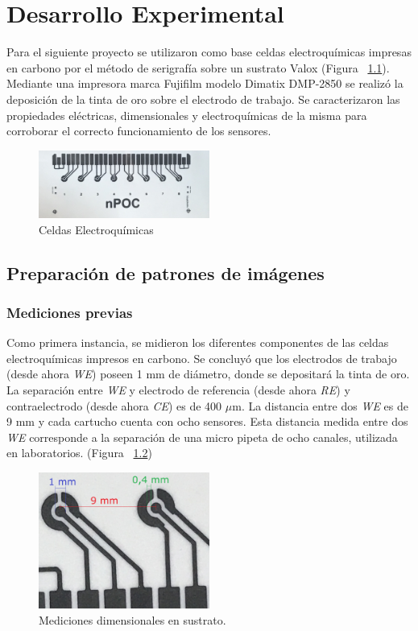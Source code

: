 \chapter{Desarrollo Experimental}
Para el siguiente proyecto se utilizaron como base celdas electroquímicas impresas en carbono por el método de serigrafía sobre un sustrato Valox (Figura ~\ref{fig:Figura_Electrodos_nPOC}). Mediante una impresora marca Fujifilm modelo Dimatix DMP-2850 se realizó la deposición de la tinta de oro sobre el electrodo de trabajo. Se caracterizaron las propiedades eléctricas, dimensionales y electroquímicas de la misma para corroborar el correcto funcionamiento de los sensores.

\begin{figure}[H]
  \centering
    \includegraphics[width=0.5\textwidth]{Figuras/Figura_Electrodos_nPOC}
  \caption{Celdas Electroqu\'imicas}
  \label{fig:Figura_Electrodos_nPOC}
\end{figure}

\section{Preparación de patrones de imágenes}

\subsection{Mediciones previas}
Como primera instancia, se midieron los diferentes componentes de las celdas electroquímicas impresos en carbono. Se concluyó que los electrodos de trabajo (desde ahora \emph{WE}) poseen 1 mm de diámetro, donde se depositará la tinta de oro. La separación entre \emph{WE} y electrodo de referencia (desde ahora \emph{RE}) y contraelectrodo (desde ahora \emph{CE}) es de 400 $\mu$m. La distancia entre dos \emph{WE} es de 9 mm y cada cartucho cuenta con ocho sensores. Esta distancia medida entre dos \emph{WE} corresponde a la separación de una micro pipeta de ocho canales, utilizada en laboratorios. (Figura ~\ref{fig:Figura_medicion_celdas})

\begin{figure}[H]
  \centering
    \includegraphics[width=0.5\textwidth]{Figuras/Figura_medicion_celdas}
  \caption{Mediciones dimensionales en sustrato.}
  \label{fig:Figura_medicion_celdas}
\end{figure}

